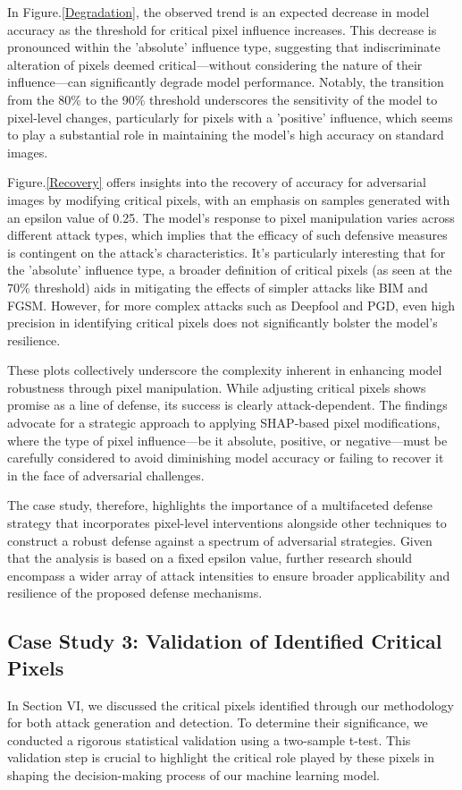 \documentclass[10pt, conference, a4paper, final]{IEEEtran}
\begin{document}
In Figure.\ref{Degradation}, the observed trend is an expected decrease in model accuracy as the threshold for critical pixel influence increases. This decrease is pronounced within the 'absolute' influence type, suggesting that indiscriminate alteration of pixels deemed critical—without considering the nature of their influence—can significantly degrade model performance. Notably, the transition from the 80\% to the 90\% threshold underscores the sensitivity of the model to pixel-level changes, particularly for pixels with a 'positive' influence, which seems to play a substantial role in maintaining the model's high accuracy on standard images.

Figure.\ref{Recovery} offers insights into the recovery of accuracy for adversarial images by modifying critical pixels, with an emphasis on samples generated with an epsilon value of 0.25. The model's response to pixel manipulation varies across different attack types, which implies that the efficacy of such defensive measures is contingent on the attack's characteristics. It's particularly interesting that for the 'absolute' influence type, a broader definition of critical pixels (as seen at the 70\% threshold) aids in mitigating the effects of simpler attacks like BIM and FGSM. However, for more complex attacks such as Deepfool and PGD, even high precision in identifying critical pixels does not significantly bolster the model's resilience.

These plots collectively underscore the complexity inherent in enhancing model robustness through pixel manipulation. While adjusting critical pixels shows promise as a line of defense, its success is clearly attack-dependent. The findings advocate for a strategic approach to applying SHAP-based pixel modifications, where the type of pixel influence—be it absolute, positive, or negative—must be carefully considered to avoid diminishing model accuracy or failing to recover it in the face of adversarial challenges.

The case study, therefore, highlights the importance of a multifaceted defense strategy that incorporates pixel-level interventions alongside other techniques to construct a robust defense against a spectrum of adversarial strategies. Given that the analysis is based on a fixed epsilon value, further research should encompass a wider array of attack intensities to ensure broader applicability and resilience of the proposed defense mechanisms.
  

  \subsection{Case Study 3: Validation of Identified Critical Pixels}
    In Section VI, we discussed the critical pixels identified through our methodology for both attack generation and detection. To determine their significance, we conducted a rigorous statistical validation using a two-sample t-test. This validation step is crucial to highlight the critical role played by these pixels in shaping the decision-making process of our machine learning model.
\end{document}
